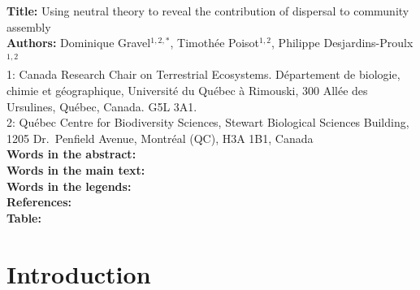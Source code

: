 \documentclass[12pt]{article}
\begin{document}
\linenumbers 
\modulolinenumbers[1]

\textbf{Title:}   Using neutral theory to reveal the contribution of dispersal to community assembly\\

\textbf{Authors:}  Dominique Gravel$^{1,2,*}$, Timoth\'ee Poisot$^{1,2}$, Philippe Desjardins-Proulx$^{1,2}$\\

1: Canada Research Chair on Terrestrial Ecosystems. D\'epartement de biologie, chimie et g\'eographique, Universit\'e du Qu\'ebec \`a Rimouski, 300 All\'ee des Ursulines, Qu\'ebec, Canada. G5L 3A1.\\

2: Qu\'ebec Centre for Biodiversity Sciences, Stewart Biological Sciences Building, 1205 Dr.~Penfield Avenue, Montr\'eal (QC), H3A 1B1, Canada\\

\textbf{Words in the abstract:}      \\
\textbf{Words in the main text:}    \\
\textbf{Words in the legends:}    \\
\textbf{References:}             \\
\textbf{Table:}                    \\

\newpage
\doublespacing

\section{Introduction}
\end{document}
